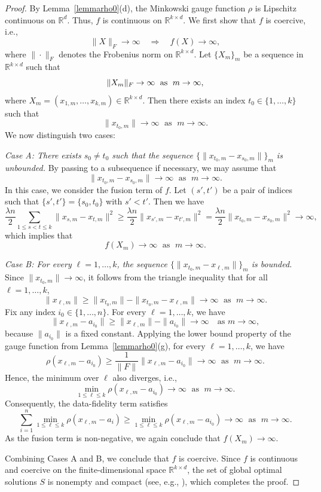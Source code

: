 \documentclass[11pt]{article}
\theoremstyle{definition}
\newcommand{\1}{\mathbf{1}}
\begin{document}
\begin{proof}
By Lemma~\ref{lemmarho0}(d), the Minkowski gauge function $\rho$ is Lipschitz continuous on $\mathbb{R}^d$.  Thus, $f$ is continuous on $\mathbb{R}^{k\times d}$. We first show that $f$ is coercive, i.e.,
\begin{equation}\label{eq1}
\|X\|_F \to \infty \quad \Longrightarrow \quad f(X) \to \infty,
\end{equation}
where $\|\cdot\|_F$ denotes the Frobenius norm on $\mathbb{R}^{k\times d}$.
Let $\{X_m\}_m$ be a sequence in $\mathbb{R}^{k\times d}$ such that 
$$\|X_m\|_F \to \infty\text{\; as }\;m \to \infty,$$ where $X_m = (x_{1,m}, \dots, x_{k,m}) \in \mathbb{R}^{k \times d}$. Then there exists an index $t_0 \in \{1, \dots, k\}$ such that $$\|x_{t_0,m}\| \to \infty\;\text{ as }\;m \to \infty.$$ 
We now distinguish two cases:

\medskip
\noindent\emph{Case A: There exists $s_0 \neq t_0$ such that the sequence $\{\|x_{t_0,m} - x_{s_0,m}\|\}_m$ is unbounded.} 
By passing to a subsequence if necessary, we may assume that $$\|x_{t_0,m} - x_{s_0,m}\| \to \infty\;\text{ as }\;m \to \infty.$$ 
In this case, we consider the fusion term of $f$. Let $(s', t')$ be a pair of indices such that $\{s', t'\} = \{s_0, t_0\}$ with $s' < t'$. Then we have
\[
\frac{\lambda n}{2} \sum_{1 \le s < t \le k} \|x_{s,m} - x_{t,m}\|^2 
\ge \frac{\lambda n}{2} \|x_{s',m} - x_{t',m}\|^2 
= \frac{\lambda n}{2} \|x_{t_0,m} - x_{s_0,m}\|^2 \to \infty,
\]
which implies that $$f(X_m) \to \infty\;\text{ as }\;m \to \infty.$$

\medskip
\noindent\emph{Case B: For every $\ell = 1, \dots, k$, the sequence $\{\|x_{t_0,m} - x_{\ell,m}\|\}_m$ is bounded.} 
Since $\|x_{t_0,m}\| \to \infty$, it follows from the triangle inequality that for all $\ell = 1, \dots, k$,
\[
\|x_{\ell,m}\| \ge \|x_{t_0,m}\| - \|x_{t_0,m} - x_{\ell,m}\| \to \infty \;\text{ as }\; m \to \infty.
\]
Fix any index $i_0 \in \{1, \dots, n\}$. For every $\ell = 1, \dots, k$, we have$$\|x_{\ell,m} - a_{i_0}\| \ge \|x_{\ell,m}\| - \|a_{i_0}\| \to \infty \quad \text{as } m \to \infty,$$because $\|a_{i_0}\|$ is a fixed constant. 
Applying the lower bound property of the gauge function from Lemma~\ref{lemmarho0}(g), for every $\ell = 1, \dots, k$, we have
\[
\rho(x_{\ell,m} - a_{i_0}) \ge \frac{1}{\|F\|} \|x_{\ell,m} - a_{i_0}\| \to \infty \;\text{ as }\; m \to \infty.
\]
Hence, the minimum over $\ell$ also diverges, i.e.,
\[
\min_{1 \le \ell \le k} \rho(x_{\ell,m} - a_{i_0}) \to \infty \;\text{ as }\; m \to \infty.
\]
Consequently, the data-fidelity term satisfies
\[
\sum_{i=1}^n \min_{1 \le \ell \le k} \rho(x_{\ell,m} - a_i) \ge \min_{1 \le \ell \le k} \rho(x_{\ell,m} - a_{i_0}) \to \infty \;\text{ as }\; m \to \infty.
\]
As the fusion term is non-negative, we again conclude that $f(X_m) \to \infty$.

\medskip
Combining Cases A and B, we conclude that $f$ is coercive. Since $f$ is continuous and coercive on the finite-dimensional space $\mathbb{R}^{k\times d}$, the set of global optimal solutions $S$ is nonempty and compact (see, e.g., \cite[Theorem 1.9]{rockafellar2009variational}), which completes the proof.
\end{proof}
\end{document}

